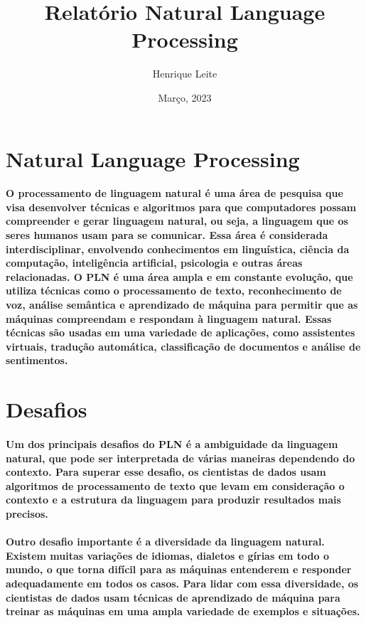 \documentclass{article}
\title{Relatório Natural Language Processing}
\author{Henrique Leite}
\date{Março, 2023}
\begin{document}
\maketitle

\section{Natural Language Processing}
\paragraph{O processamento de linguagem natural é uma área de pesquisa que visa
desenvolver técnicas e algoritmos para que computadores possam compreender e
gerar linguagem natural, ou seja, a linguagem que os seres humanos usam para se
comunicar. Essa área é considerada interdisciplinar, envolvendo conhecimentos em
linguística, ciência da computação, inteligência artificial, psicologia e outras áreas
relacionadas. O PLN é uma área ampla e em constante evolução, que utiliza
técnicas como o processamento de texto, reconhecimento de voz, análise semântica
e aprendizado de máquina para permitir que as máquinas compreendam e
respondam à linguagem natural. Essas técnicas são usadas em uma variedade de
aplicações, como assistentes virtuais, tradução automática, classificação de
documentos e análise de sentimentos.}

\section{Desafios}
\paragraph{Um dos principais desafios do PLN é a ambiguidade da linguagem natural, que pode
ser interpretada de várias maneiras dependendo do contexto. Para superar esse
desafio, os cientistas de dados usam algoritmos de processamento de texto que
levam em consideração o contexto e a estrutura da linguagem para produzir
resultados mais precisos.}

\paragraph{Outro desafio importante é a diversidade da linguagem natural. Existem muitas
variações de idiomas, dialetos e gírias em todo o mundo, o que torna difícil para as
máquinas entenderem e responder adequadamente em todos os casos. Para lidar
com essa diversidade, os cientistas de dados usam técnicas de aprendizado de
máquina para treinar as máquinas em uma ampla variedade de exemplos e
situações.}
\end{document}
